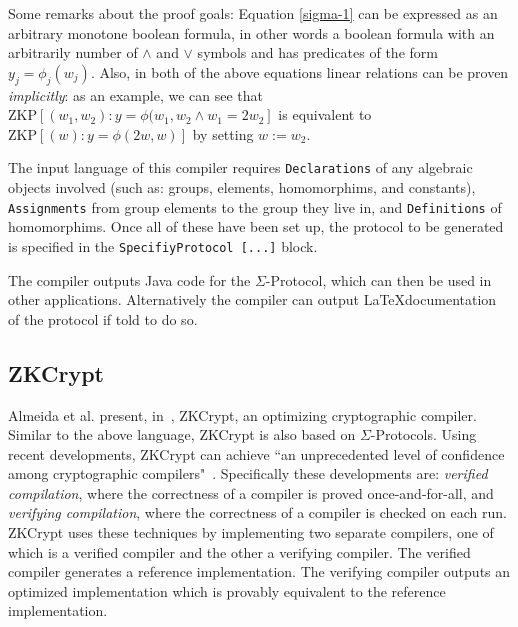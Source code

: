\documentclass{sig-alternate}
\begin{document}
		Some remarks about the proof goals: Equation \eqref{sigma-1} can be expressed
		as an arbitrary monotone boolean formula, in other words a boolean formula
		with an arbitrarily number of $\land$ and $\lor$ symbols and has predicates of
		the form $y_{j} = \phi_{j}(w_{j}).$ Also, in both of the above equations
		linear relations can be proven \textit{implicitly}: as an example, we can
		see that $\text{ZKP}[(w_{1},w_{2}):y = \phi(w_{1},w_{2} \land w_{1} = 2w_{2}]$
		is equivalent to $\text{ZKP}[(w):y = \phi(2w,w)]$ by setting $w:=w_{2}$.
		
		The input language of this compiler requires \texttt{Declarations} of any
		algebraic objects involved (such as: groups, elements, homomorphims, and
		constants), \texttt{Assignments} from group elements to the group
		they live in, and \texttt{Definitions} of homomorphims. Once all of these
		have been set up, the protocol to be generated is specified in the
		\texttt{SpecifiyProtocol [...]} block.
		
		The compiler outputs Java code for the $\Sigma$-Protocol, which
		can then be used in other applications. Alternatively the compiler
		can output \LaTeX documentation of the protocol if told to do so.
		
	\subsection{ZKCrypt}
		Almeida et al. present, in~\cite{ZKCrypt:2012}, ZKCrypt, an optimizing cryptographic
		compiler. Similar to the above language, ZKCrypt is also based on $\Sigma$-Protocols.
		Using recent developments, ZKCrypt can achieve ``an unprecedented level of confidence
		among cryptographic compilers"~\cite{ZKCrypt:2012}. Specifically these developments are:
		\textit{verified compilation}, where the correctness of a compiler is proved once-and-for-all,
		and \textit{verifying compilation}, where the correctness of a compiler is checked on
		each run. ZKCrypt uses these techniques by implementing two separate compilers, one of which
		is a verified compiler and the other a verifying compiler. The verified compiler generates
		a reference implementation. The verifying compiler outputs an optimized implementation
		which is provably equivalent to the reference implementation. 
		
\end{document}
